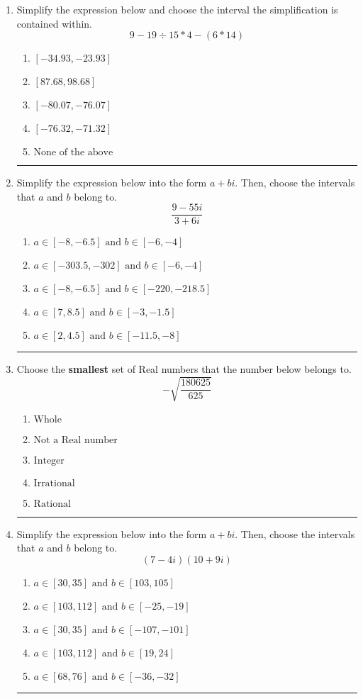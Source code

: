 \documentclass[14pt]{extbook}
\newcommand{\litem}[1]{\item#1\hspace*{-1cm}\rule{\textwidth}{0.4pt}}
\begin{document}
\begin{enumerate}
{\begin{enumerate}[label=\Alph*.]
\end{enumerate} }
\litem{
Simplify the expression below and choose the interval the simplification is contained within.\[ 9 - 19 \div 15 * 4 - (6 * 14) \]\begin{enumerate}[label=\Alph*.]
\item \( [-34.93, -23.93] \)
\item \( [87.68, 98.68] \)
\item \( [-80.07, -76.07] \)
\item \( [-76.32, -71.32] \)
\item \( \text{None of the above} \)

\end{enumerate} }
\litem{
Simplify the expression below into the form $a+bi$. Then, choose the intervals that $a$ and $b$ belong to.\[ \frac{9 - 55 i}{3 + 6 i} \]\begin{enumerate}[label=\Alph*.]
\item \( a \in [-8, -6.5] \text{ and } b \in [-6, -4] \)
\item \( a \in [-303.5, -302] \text{ and } b \in [-6, -4] \)
\item \( a \in [-8, -6.5] \text{ and } b \in [-220, -218.5] \)
\item \( a \in [7, 8.5] \text{ and } b \in [-3, -1.5] \)
\item \( a \in [2, 4.5] \text{ and } b \in [-11.5, -8] \)

\end{enumerate} }
\litem{
Choose the \textbf{smallest} set of Real numbers that the number below belongs to.\[ -\sqrt{\frac{180625}{625}} \]\begin{enumerate}[label=\Alph*.]
\item \( \text{Whole} \)
\item \( \text{Not a Real number} \)
\item \( \text{Integer} \)
\item \( \text{Irrational} \)
\item \( \text{Rational} \)

\end{enumerate} }
\litem{
Simplify the expression below into the form $a+bi$. Then, choose the intervals that $a$ and $b$ belong to.\[ (7 - 4 i)(10 + 9 i) \]\begin{enumerate}[label=\Alph*.]
\item \( a \in [30, 35] \text{ and } b \in [103, 105] \)
\item \( a \in [103, 112] \text{ and } b \in [-25, -19] \)
\item \( a \in [30, 35] \text{ and } b \in [-107, -101] \)
\item \( a \in [103, 112] \text{ and } b \in [19, 24] \)
\item \( a \in [68, 76] \text{ and } b \in [-36, -32] \)


\end{enumerate}}
\end{enumerate}
\end{document}
